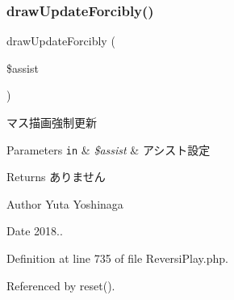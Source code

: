 \subsubsection{\texorpdfstring{draw\+Update\+Forcibly()}{drawUpdateForcibly()}}
{\footnotesize\ttfamily draw\+Update\+Forcibly (\begin{DoxyParamCaption}\item[{}]{\$assist }\end{DoxyParamCaption})}



マス描画強制更新 


\begin{DoxyParams}[1]{Parameters}
\mbox{\tt in}  & {\em \$assist} & アシスト設定 \\
\hline
\end{DoxyParams}
\begin{DoxyReturn}{Returns}
ありません 
\end{DoxyReturn}
\begin{DoxyAuthor}{Author}
Yuta Yoshinaga 
\end{DoxyAuthor}
\begin{DoxyDate}{Date}
2018.. 
\end{DoxyDate}


Definition at line 735 of file Reversi\+Play.\+php.



Referenced by reset().


